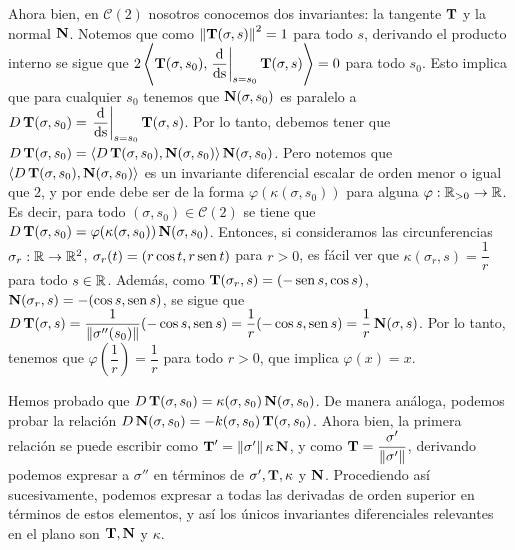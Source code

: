 Ahora bien, en $\mathscr{C}(2)$ nosotros conocemos dos invariantes: la tangente $\operatorname{\mathbf{T}}$ y la normal $\operatorname{\mathbf{N}}$. Notemos que como $\left\| \operatorname{\mathbf{T}}(\sigma,s) \right\|^2 = 1$ para todo $s$, derivando el producto interno se sigue que $2\left\langle \operatorname{\mathbf{T}}(\sigma,s_0),\left.\dfrac{\mathrm{d}}{\mathrm{ds}}\right\rvert_{s=s_0}\operatorname{\mathbf{T}}(\sigma,s) \right\rangle = 0$ para todo $s_0$. Esto implica que para cualquier $s_0$ tenemos que $\operatorname{\mathbf{N}}(\sigma,s_0)$ es paralelo a $D\operatorname{\mathbf{T}}(\sigma,s_0)=\left.\dfrac{\mathrm{d}}{\mathrm{ds}}\right\rvert_{s=s_0} \operatorname{\mathbf{T}}(\sigma,s)$. Por lo tanto, debemos tener que $D\operatorname{\mathbf{T}}(\sigma,s_0) = \left\langle D\operatorname{\mathbf{T}}(\sigma,s_0),\operatorname{\mathbf{N}}(\sigma,s_0) \right\rangle\operatorname{\mathbf{N}}(\sigma,s_0)$. Pero notemos que $\left\langle D\operatorname{\mathbf{T}}(\sigma,s_0),\operatorname{\mathbf{N}}(\sigma,s_0) \right\rangle$ es un invariante diferencial escalar de orden menor o igual que $2$, y por ende debe ser de la forma $\varphi(\kappa(\sigma,s_0))$ para alguna $\varphi:\mathbb{R}_{>0}\to\mathbb{R}$. Es decir, para todo $(\sigma,s_0)\in\mathscr{C}(2)$ se tiene que $D\operatorname{\mathbf{T}}(\sigma,s_0)=\varphi(\kappa(\sigma,s_0))\operatorname{\mathbf{N}}(\sigma,s_0)$. Entonces, si consideramos las circunferencias $\sigma_r:\mathbb{R}\to\mathbb{R}^2$, $\sigma_r(t)=(r\cos t,r\operatorname{sen} t)$ para $r>0$, es fácil ver que $\kappa(\sigma_r,s)=\dfrac{1}{r}$ para todo $s\in\mathbb{R}$. Además, como $\operatorname{\mathbf{T}}(\sigma_r,s)=(-\operatorname{sen} s,\cos s)$, $\operatorname{\mathbf{N}}(\sigma_r,s)=-(\cos s,\operatorname{sen} s)$, se sigue que $D\operatorname{\mathbf{T}}(\sigma,s)=\dfrac{1}{\left\| \sigma''(s_0) \right\|}(-\cos s,\operatorname{sen} s) = \dfrac{1}{r}(-\cos s,\operatorname{sen} s) = \dfrac{1}{r}\operatorname{\mathbf{N}}(\sigma,s)$. Por lo tanto, tenemos que $\varphi\left(\dfrac{1}{r}\right)=\dfrac{1}{r}$ para todo $r>0$, que implica $\varphi(x)=x$. 

Hemos probado que $D\operatorname{\mathbf{T}}(\sigma,s_0)=\kappa(\sigma,s_0)\operatorname{\mathbf{N}}(\sigma,s_0)$. De manera análoga, podemos probar la relación $D\operatorname{\mathbf{N}}(\sigma,s_0)=-k(\sigma,s_0)\operatorname{\mathbf{T}}(\sigma,s_0)$. Ahora bien, la primera relación se puede escribir como $\operatorname{\mathbf{T}}' = \left\| \sigma' \right\|\kappa\operatorname{\mathbf{N}}$, y como $\operatorname{\mathbf{T}} = \dfrac{\sigma'}{\left\| \sigma' \right\|}$, derivando podemos expresar a $\sigma''$ en términos de $\sigma',\operatorname{\mathbf{T}},\kappa$ y $\operatorname{\mathbf{N}}$. Procediendo así sucesivamente, podemos expresar a todas las derivadas de orden superior en términos de estos elementos, y así los únicos invariantes diferenciales relevantes en el plano son $\operatorname{\mathbf{T}},\operatorname{\mathbf{N}}$ y $\kappa$.

